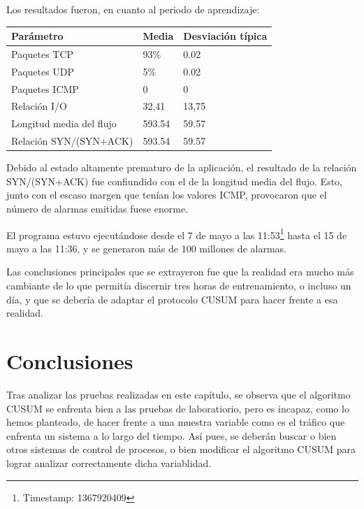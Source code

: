 Los resultados fueron, en cuanto al periodo de aprendizaje:
\begin{table}[htbp]
 \centering
 \begin {tabular}{lll}
  Parámetro & Media & Desviación típica  \\\hline
  Paquetes TCP & 93\% & 0.02 \\
  Paquetes UDP & 5\%  & 0.02 \\
  Paquetes ICMP & 0 & 0      \\
  Relación I/O & 32,41 & 13,75 \\
  Longitud media del flujo & 593.54 & 59.57 \\
  Relación SYN/(SYN+ACK) & 593.54 & 59.57   
 \end {tabular}
\end{table}

Debido al estado altamente prematuro de la aplicación, el resultado de la relación SYN/(SYN+ACK) fue confiundido con el 
de la longitud media del flujo. Esto, junto con el escaso margen que tenían los valores ICMP, provocaron que el número 
de alarmas emitidas fuese enorme.

El programa estuvo ejecutándose desde el 7 de mayo a las 11:53\footnote{Timestamp: 1367920409} hasta el 15 de mayo a 
las 11:36, y se generaron más de 100 millones de alarmas.

Las conclusiones principales que se extrayeron fue que la realidad era mucho más cambiante de lo que permitía discernir 
tres horas de entrenamiento, o incluso un día, y que se debería de adaptar el protocolo CUSUM para hacer frente a esa 
realidad.

\section{Conclusiones}
Tras analizar las pruebas realizadas en este capítulo, se observa que el algoritmo CUSUM se enfrenta bien a las pruebas 
de laboratiorio, pero es incapaz, como lo hemos planteado, de hacer frente a una muestra variable como es el tráfico 
que enfrenta un sistema a lo largo del tiempo. Así pues, se deberán buscar o bien otros sistemas de control de 
procesos, o bien modificar el algoritmo CUSUM para lograr analizar correctamente dicha variablidad.


\endinput

